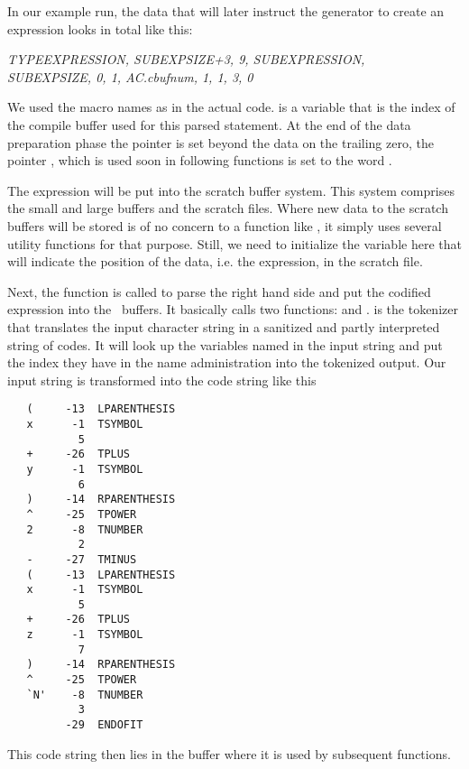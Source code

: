 	In our example run, the data that will later instruct the generator to 
create an expression looks in total like this:

\begin{center}
{\it TYPEEXPRESSION, SUBEXPSIZE+3, 9, SUBEXPRESSION, \\
SUBEXPSIZE, 0, 1, AC.cbufnum, 1, 1, 3, 0}
\end{center}

We used the macro names as in the actual code.  is a variable that
is the index of the compile buffer used for this parsed statement.
At the end of the data preparation phase the pointer  is set
beyond the data on the trailing zero, the pointer , which is
used soon in following functions is set to the word .

The expression will be put into the scratch buffer system. This system comprises
the small and large buffers and the scratch files. Where new data to the scratch
buffers will be stored is of no concern to a function like , it
simply uses several utility functions for that purpose. Still, we need to
initialize the variable  here that will indicate the position of the
data, i.e. the expression, in the scratch file.

Next, the function  is called to parse the right hand side
and put the codified expression into the \FORM\ buffers. It basically calls two
functions:  and .  is the
tokenizer that translates the input character string in a sanitized and partly
interpreted string of codes. It will look up the variables named in the input
string and put the index they have in the name administration into the tokenized
output. Our input string is transformed into the code string like this

\begin{verbatim}
   (     -13  LPARENTHESIS
   x      -1  TSYMBOL
           5
   +     -26  TPLUS
   y      -1  TSYMBOL
           6
   )     -14  RPARENTHESIS
   ^     -25  TPOWER
   2      -8  TNUMBER
           2
   -     -27  TMINUS
   (     -13  LPARENTHESIS
   x      -1  TSYMBOL
           5
   +     -26  TPLUS
   z      -1  TSYMBOL
           7
   )     -14  RPARENTHESIS
   ^     -25  TPOWER
   `N'    -8  TNUMBER
           3
         -29  ENDOFIT
\end{verbatim}

This code string then lies in the  buffer where it is used by
subsequent functions.


